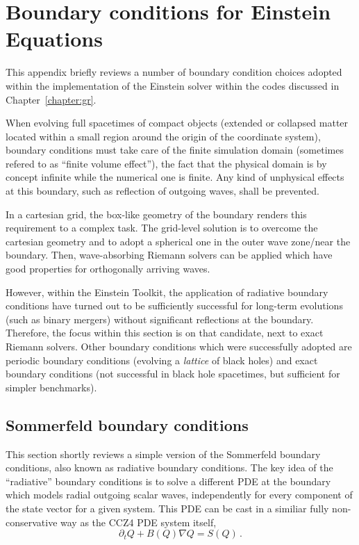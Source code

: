 
\newcommand{\Int}[2]{\int\limits_{\mathrlap{#1}}^{\mathrlap{#2}}}

\section{Boundary conditions for Einstein Equations}
\label{sec:apx-bc}
This appendix briefly reviews a number of boundary condition choices
adopt\-ed within the implementation of the Einstein solver within the codes
discussed in Chapter~\ref{chapter:gr}.

When evolving full spacetimes of compact objects (\ie extended or collapsed
matter located within a small region around the origin of the coordinate
system), boundary conditions must take care of the finite simulation domain
(sometimes refered to as ``finite volume effect''), \ie the fact that the
physical domain is by concept infinite while the numerical one is finite.
Any kind of unphysical effects at this boundary, such as reflection of
outgoing waves, shall be prevented.

In a cartesian grid, the box-like geometry of the boundary renders this
requirement to a complex task. The grid-level solution is to overcome the
cartesian geometry and to adopt a spherical one in the outer wave zone/near
the boundary. Then, wave-absorbing Riemann solvers can be applied which have
good properties for orthogonally arriving waves.

However, within the Einstein Toolkit, the application of radiative boundary
conditions have turned out to be sufficiently successful for long-term 
evolutions (such as binary mergers) without significant reflections at the
boundary. Therefore, the focus within this section is on that candidate,
next to exact Riemann solvers. Other boundary conditions which were
successfully adopted are periodic boundary conditions (\ie evolving a
\emph{lattice} of black holes) and exact boundary conditions (not successful
in black hole spacetimes, but sufficient for simpler benchmarks).

\subsection{Sommerfeld boundary conditions}
This section shortly reviews a simple version of the Sommerfeld boundary
conditions, also known as radiative boundary conditions. The key idea of the
``radiative'' boundary conditions is to solve a different
PDE at the boundary which models radial outgoing scalar waves, independently
for every component of the state vector for a given system.  This PDE can be
cast in a similiar fully non-conservative way as the CCZ4 PDE system itself, \ie
\begin{equation}\label{eq:apx-bc-base-pde}
\partial_t Q + B(Q) \nabla Q = S(Q)
\,.
\end{equation}

